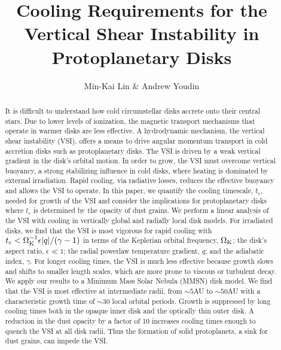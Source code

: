 \documentclass[iop]{emulateapj}
\def \OmK {\Omega_{\rm K}}
\begin{document}
\title{Cooling Requirements for the Vertical Shear Instability 
  in Protoplanetary Disks}
\author{Min-Kai Lin \& Andrew Youdin}

\begin{abstract}
  It is difficult to understand how cold circumstellar disks accrete onto their central stars.  Due to 
  lower levels of ionization, the magnetic transport mechanisms that
  operate in warmer disks are less effective.  
  A hydrodynamic mechanism, the vertical shear instability (VSI), offers a means to drive angular momentum 
  transport in cold accretion disks such as protoplanetary disks.  
  The VSI is driven by a weak vertical gradient in the disk's orbital motion.
  In order to grow, the VSI must overcome vertical buoyancy, a strong
  stabilizing influence in cold disks, where  
  heating is dominated by external irradiation.  Rapid cooling, via
  radiative losses, reduces the effective buoyancy 
  and allows the VSI to operate.  In this paper, we quantify the
  cooling timescale, $t_c$, needed for growth of the VSI 
  and consider the implications for protoplanetary disks where $t_c$ is determined by the opacity of dust 
  grains.  We perform a linear analysis of the VSI with cooling in
  vertically global and radially local disk models. 
  For irradiated disks, we find that the VSI is most vigorous for
  rapid cooling with $t_c < \OmK^{-1} \epsilon |q| / (\gamma -1)$ 
  in terms of the Keplerian orbital frequency, $\OmK$; the disk's
  aspect ratio, $\epsilon \ll 1$; the radial  
  powerlaw temperature gradient, $q$; and the adiabatic index,
  $\gamma$.  For longer cooling times, the VSI  
  is much less effective because growth slows and shifts to smaller length scales, which are more prone to 
  viscous or turbulent decay.  We apply our results to a  Minimum Mass Solar Nebula (MMSN) disk model.  We
  find that the VSI is most effective at intermediate radii, from $\sim 5$AU to $\sim 50$AU with a
  characteristic growth time of $\sim 30$ local orbital periods.
  Growth is suppressed by long cooling times both in the opaque  
  inner disk and the optically thin outer disk.  A reduction in the
  dust opacity by a factor of 10 increases cooling times  
  enough to quench the VSI at all disk radii.  Thus the formation of
  solid protoplanets, a sink for dust grains, can impede the VSI. 
\end{abstract}
\end{document}
